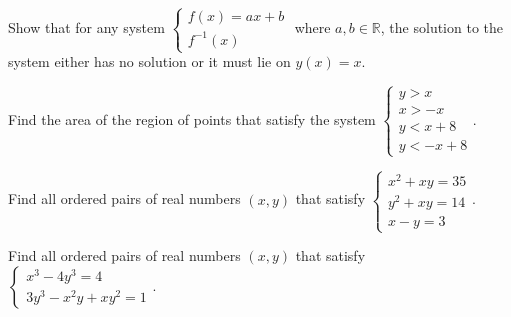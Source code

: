 \documentclass[../book.tex]{subfiles}
\begin{document}
\begin{challengeset}
\item Show that for any system $\begin{cases} f(x)=ax+b \\ f^{-1}(x) \end{cases}$ where $a,b\in\mathbb{R}$, the solution to the system either has no solution or it must lie on $y(x)=x$.
\item Find the area of the region of points that satisfy the system $\begin{cases} y>x \\ x>-x \\ y<x+8 \\ y<-x+8 \end{cases}$.
\item Find all ordered pairs of real numbers $(x,y)$ that satisfy $\begin{cases} x^2+xy=35 \\ y^2+xy=14 \\ x-y=3 \end{cases}$.
\item Find all ordered pairs of real numbers $(x,y)$ that satisfy $\begin{cases} x^3-4y^3=4 \\ 3y^3-x^2y+xy^2=1 \end{cases}$.
\end{challengeset}
\end{document}
